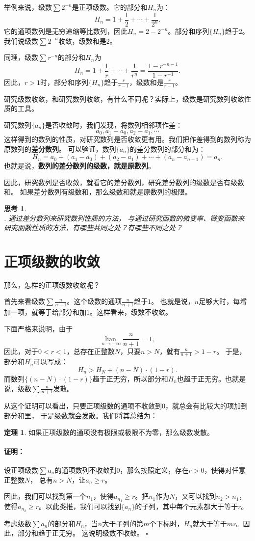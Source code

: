 \documentclass[12pt,UTF8]{ctexbook}
\newcommand{\lian}[1]{
    \underset{#1}{\operatorname{lian}\,}
}
\theoremstyle{definition}
\newtheorem{tm}{定理}[section]
\theoremstyle{plain}
\newtheorem{sk}{思考}[section]
\renewenvironment{proof}{\paragraph{\textbf{证明：}}}{\hfill$\square$}
\begin{document}
举例来说，级数$\sum 2^{-n}$是正项级数。它的部分和$H_n$为：
$$ H_n = 1 + \frac{1}{2} + \cdots + \frac{1}{2^n}.$$
它的通项数列是无穷递缩等比数列，因此$H_n = 2 - 2^{-n}$。部分和序列$\{H_n\}$趋于$2$。
我们说级数$\sum 2^{-n}$收敛，级数和是$2$。

同理，级数$\sum r^{-n}$的部分和$H_n$为
$$ H_n = 1 + \frac{1}{r} + \cdots + \frac{1}{r^n} = \frac{1 - r^{-n-1}}{1 - r^{-1}}.$$
因此，$r>1$时，部分和序列$\{H_n\}$趋于$\frac{r}{r - 1}$，级数和是$\frac{r}{r - 1}$。

研究级数收敛，和研究数列收敛，有什么不同呢？实际上，级数是研究数列收敛性质的工具。

研究数列$\{a_n\}$是否收敛时，我们发现，将数列相邻项作差：
$$ a_0, a_1 - a_0, a_2 - a_1, \cdots $$
这样得到的数列的性质，对研究数列是否收敛更有用。我们把作差得到的数列称为原数列的\textbf{差分数列}。
可以验证，数列$\{a_n\}$的差分数列的部分和为：
$$ H_n = a_0 + (a_1 - a_0) + (a_2 - a_1) + \cdots + (a_n - a_{n-1}) = a_n. $$
也就是说，\textbf{数列的差分数列的级数，就是原数列}。

因此，研究数列是否收敛，就看它的差分数列，研究差分数列的级数是否有级数和。
如果差分数列有级数和，那么级数和就是原数列的极限。

\begin{sk}
    \mbox{} \\
    . 通过差分数列来研究数列性质的方法，
    与通过研究函数的微变率、微变函数来研究函数性质的方法，有哪些共同之处？有哪些不同之处？
\end{sk}

\section{正项级数的收敛}
那么，怎样的正项级数收敛呢？

首先来看级数$\sum \frac{n}{n+1}$。这个级数的通项$\frac{n}{n+1}$趋于$1$。
也就是说，$n$足够大时，每增加一项，就等于给部分和加$1$。这样看来，级数不收敛。

下面严格来说明，由于
$$\lian{n\to +\infty }\frac{n}{n+1} = 1,$$
因此，对于$0<r<1$，总存在正整数$N$，只要$n>N$，就有$\frac{n}{n+1} > 1 - r$。
于是，部分和$H_n$可以写成：
$$ H_n > H_N + (n - N) \cdot (1 - r).$$
而数列$\{(n - N) \cdot (1 - r)\}$趋于正无穷，所以部分和$H_n$也趋于正无穷。也就是说，级数$\sum \frac{n}{n+1}$发散。

从这个证明可以看出，只要正项级数的通项不收敛到$0$，就总会有比较大的项加到部分和里，
于是级数就会发散。我们将其总结为：
\begin{tm}
    如果正项级数的通项没有极限或极限不为零，那么级数发散。
\end{tm}
\begin{proof}
    设正项级数$\sum a_n$的通项数列不收敛到$0$，那么按照定义，存在$r>0$，使得对任意正整数$N$，
    总有$n > N$，让$a_n \geqslant r$。

    因此，我们可以找到第一个$n_1$，使得$a_{n_1} \geqslant r$。把$n_1$作为$N$，又可以找到$n_2 > n_1$，
    使得$a_{n_2} \geqslant r$。以此类推，我们可以找到$\{a_n\}$的子列，其中每个元素都大于等于$r$。

    考虑级数$\sum a_n$的部分和$H_n$，当$n$大于子列的第$m$个下标时，$H_n$就大于等于$mr$。因此，部分和趋于正无穷。
    这说明级数不收敛。
\end{proof}
\end{document}
